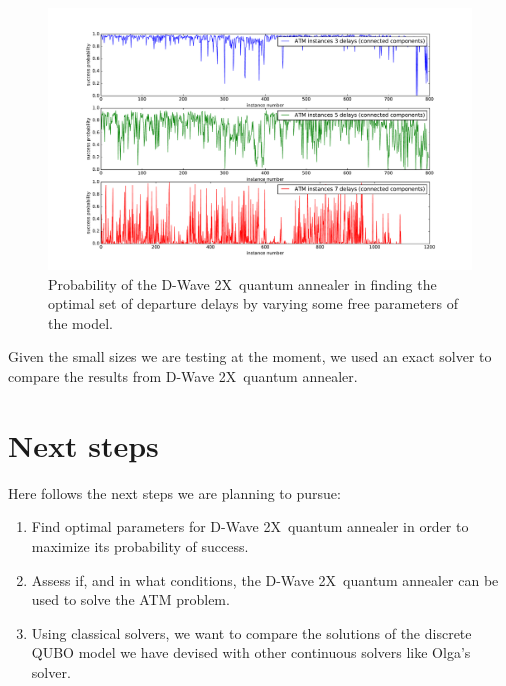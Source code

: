 \documentclass[twocolumn,9pt]{article}
\newcommand{\DW}{D-Wave 2X}
\begin{document}
\begin{figure}[h!]
\centering
\includegraphics[scale=0.4]{images/prob_dwave.pdf}
\caption{\label{fig:prob_dw2x}Probability of the \DW~quantum annealer in finding the optimal set
of departure delays by varying some free parameters of the model.}
\end{figure}
%
Given the small sizes we are testing at the moment, we used an exact solver to compare the results from
\DW~quantum annealer.

\section*{Next steps}

Here follows the next steps we are planning to pursue:
\begin{enumerate}
  \item Find optimal parameters for \DW~quantum annealer in order to maximize its probability of success.
  \item Assess if, and in what conditions, the \DW~quantum annealer can be used to solve the ATM problem.
  \item Using classical solvers, we want to compare the solutions of the discrete QUBO model we have devised
        with other continuous solvers like Olga's solver.
\end{enumerate}



\end{document}
